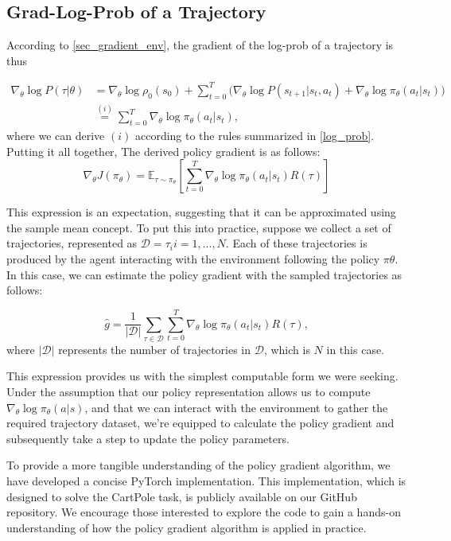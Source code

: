 \subsection{Grad-Log-Prob of a Trajectory}
According to \ref{sec_gradient_env}, the gradient of the log-prob of a trajectory is thus

\begin{equation*}
  \begin{split}
  \nabla_{\theta} \log P(\tau | \theta) &= {\nabla_{\theta} \log \rho_0 (s_0)} + \sum_{t=0}^{T} \bigg( {\nabla_{\theta} \log P(s_{t+1}|s_t, a_t)}  + \nabla_{\theta} \log \pi_{\theta}(a_t |s_t)\bigg) \\
  &\stackrel{(i)}{=} \sum_{t=0}^{T} \nabla_{\theta} \log \pi_{\theta}(a_t |s_t),
  \end{split}
\end{equation*}
where we can derive $(i)$ according to the rules summarized in \ref{log_prob}. Putting it all together, The derived policy gradient is as follows:
$$
 \nabla_{\theta} J(\pi_{\theta}) = \mathbb E_{\tau \sim \pi_{\theta}}\left[{\sum_{t=0}^{T} \nabla_{\theta} \log \pi_{\theta}(a_t |s_t) R(\tau)}\right] $$

This expression is an expectation, suggesting that it can be approximated using the sample mean concept. To put this into practice, suppose we collect a set of trajectories, represented as $\mathcal{D} = {\tau_i}{i=1,...,N}$. Each of these trajectories is produced by the agent interacting with the environment following the policy $\pi{\theta}$. In this case, we can estimate the policy gradient with the sampled trajectories as follows:

$$\hat{g} = \frac{1}{|\mathcal{D}|} \sum_{\tau \in \mathcal{D}} \sum_{t=0}^{T} \nabla_{\theta} \log \pi_{\theta}(a_t |s_t) R(\tau),$$
where $|\mathcal{D}|$ represents the number of trajectories in $\mathcal{D}$, which is $N$ in this case.

This expression provides us with the simplest computable form we were seeking. Under the assumption that our policy representation allows us to compute $\nabla_{\theta} \log \pi_{\theta}(a|s)$, and that we can interact with the environment to gather the required trajectory dataset, we're equipped to calculate the policy gradient and subsequently take a step to update the policy parameters.

To provide a more tangible understanding of the policy gradient algorithm, we have developed a concise PyTorch implementation. This implementation, which is designed to solve the CartPole task, is publicly available on our GitHub repository. We encourage those interested to explore the code to gain a hands-on understanding of how the policy gradient algorithm is applied in practice.